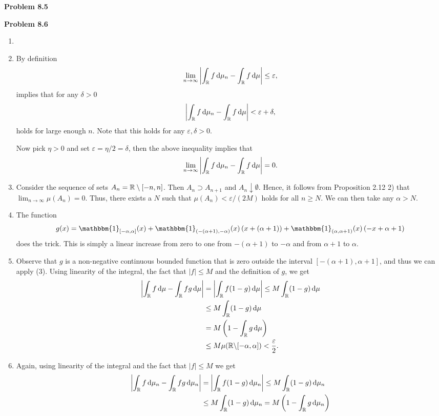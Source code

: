 \bigskip

\textbf{Problem 8.5}

\bigskip

\textbf{Problem 8.6}

\begin{enumerate}[label={(\alph*)}]
\item 
\item By definition
\[
	\lim_{n\to\infty} \left|\int_{\mathbb R} f \, \mathrm{d} \mu_n - \int_{\mathbb R} f \, \mathrm{d} \mu\right| \le \varepsilon,
\]
implies that for any $\delta > 0$
\[
	\left|\int_{\mathbb R} f \, \mathrm{d} \mu_n - \int_{\mathbb R} f \, \mathrm{d} \mu\right| < \varepsilon + \delta,
\]
holds for large enough $n$. Note that this holds for any $\varepsilon, \delta > 0$.

Now pick $\eta > 0$ and set $\varepsilon = \eta/2 = \delta$, then the above inequality implies that
\[
	\lim_{n\to\infty} \left|\int_{\mathbb R} f \, \mathrm{d} \mu_n - \int_{\mathbb R} f \, \mathrm{d} \mu\right| = 0.
\]

\item Consider the sequence of sets $A_n = \mathbb R\setminus [-n,n]$. Then $A_n \supset A_{n + 1}$ and $A_n \downarrow \emptyset$. Hence, it follows from Proposition 2.12 2) that $\lim_{n \to \infty} \mu(A_n) = 0$. Thus, there exists a $N$ such that $\mu(A_n) < \varepsilon/(2M)$ holds for all $n \ge N$. We can then take any $\alpha > N$.
\item The function
\[
	g(x) = \mathbbm{1}_{[-\alpha,\alpha]}(x) + \mathbbm{1}_{(-(\alpha+1), -\alpha)}(x)\left(x + (\alpha + 1)\right) + \mathbbm{1}_{(\alpha,\alpha+1)}(x)\left(-x + \alpha + 1\right)
\]
does the trick. This is simply a linear increase from zero to one from $-(\alpha + 1)$ to $-\alpha$ and from $\alpha + 1$ to $\alpha$.
\item Observe that $g$ is a non-negative continuous bounded function that is zero outside the interval $[-(\alpha+1), \alpha+1]$, and thus we can apply (3).
Using linearity of the integral, the fact that $|f| \le M$ and the definition of $g$, we get
\begin{align*}
	\left|\int_{\mathbb R} f \, \mathrm{d} \mu - \int_{\mathbb R} fg \, \mathrm{d} \mu\right|
	&= \left|\int_{\mathbb R} f (1-g) \, \mathrm{d} \mu\right| \le M \int_{\mathbb R} (1-g) \, \mathrm{d} \mu \\
	&\le M \int_{\mathbb R} (1-g) \, \mathrm{d} \mu \\
	&= M\left(1-\int_{\mathbb R} g \, \mathrm{d} \mu\right) \\
	&\le  M \mu(\mathbb R \backslash [-\alpha,\alpha]) < \frac{\varepsilon}{2}.
\end{align*}
\item Again, using linearity of the integral and the fact that $|f| \le M$ we get
\begin{align*}
	\left|\int_{\mathbb R} f \, \mathrm{d} \mu_n - \int_{\mathbb R} fg \, \mathrm{d} \mu_n\right|
	&= \left|\int_{\mathbb R} f (1-g) \, \mathrm{d} \mu_n\right| \le M \int_{\mathbb R} (1-g) \, \mathrm{d} \mu_n \\
	&\le M \int_{\mathbb R} (1-g) \, \mathrm{d} \mu_n = M\left(1-\int_{\mathbb R} g \, \mathrm{d} \mu_n\right)
\end{align*}


\end{enumerate}
